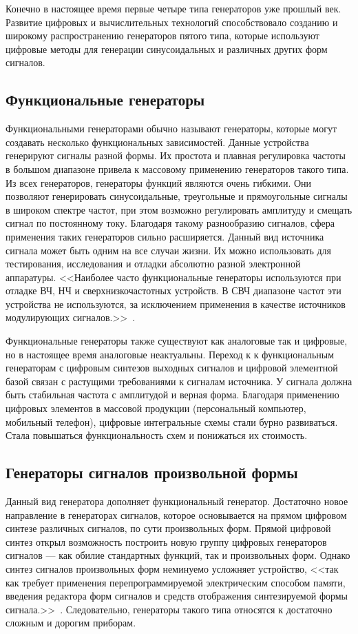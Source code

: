 	Конечно в настоящее время первые четыре типа генераторов уже прошлый век. Развитие цифровых и вычислительных технологий способствовало созданию и широкому распространению генераторов пятого типа, которые используют цифровые методы для генерации синусоидальных и различных других форм сигналов.

\subsection{Функциональные генераторы}
	Функциональными генераторами обычно называют генераторы, которые могут создавать несколько функциональных зависимостей. Данные устройства генерируют сигналы разной формы. Их простота и плавная регулировка частоты в большом диапазоне привела к массовому применению генераторов такого типа. Из всех генераторов, генераторы функций являются очень гибкими. Они позволяют генерировать синусоидальные, треугольные и прямоугольные сигналы в широком спектре частот, при этом возможно регулировать амплитуду и смещать сигнал по постоянному току. Благодаря такому разнообразию сигналов, сфера применения таких генераторов сильно расширяется. Данный вид источника сигнала может быть одним на все случаи жизни. Их можно использовать для тестирования, исследования и отладки абсолютно разной электронной аппаратуры. <<Наиболее часто функциональные генераторы используются при отладке ВЧ, НЧ и сверхнизкочастотных устройств. В СВЧ диапазоне частот эти устройства не используются, за исключением применения в качестве источников модулирующих сигналов.>>~\cite{dgs}.

	Функциональные генераторы также существуют как аналоговые так и цифровые, но в настоящее время аналоговые неактуальны. Переход к к функциональным генераторам с цифровым синтезов выходных сигналов и цифровой элементной базой связан с растущими требованиями к сигналам источника. У сигнала должна быть стабильная частота с амплитудой и верная форма. Благодаря применению цифровых элементов в массовой продукции (персональный компьютер, мобильный телефон), цифровые интегральные схемы стали бурно развиваться. Стала повышаться функциональность схем и понижаться их стоимость.



\subsection{Генераторы сигналов произвольной формы}
	Данный вид генератора дополняет функциональный генератор. Достаточно новое направление в генераторах сигналов, которое основывается на прямом цифровом синтезе различных сигналов, по сути произвольных форм. Прямой цифровой синтез открыл возможность построить новую группу цифровых генераторов сигналов --- как обилие стандартных функций, так и произвольных форм. Однако синтез сигналов произвольных форм неминуемо усложняет устройство, <<так как требует применения перепрограммируемой электрическим способом памяти, введения редактора форм сигналов и средств отображения синтезируемой формы сигнала.>>~\cite{dgs}. Следовательно, генераторы такого типа относятся к достаточно сложным и дорогим приборам.


